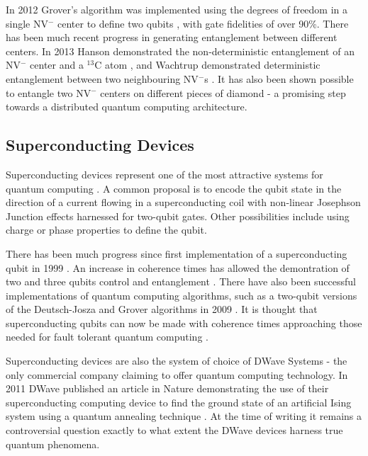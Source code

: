In 2012 Grover's algorithm was implemented using the degrees of freedom in a single NV$^{-}$ center to define two qubits \cite{two_qubit_nv}, with gate fidelities of over 90\%. There has been much recent progress in generating entanglement between different centers. In 2013 Hanson demonstrated the non-deterministic entanglement of an NV$^{-}$ center and a $^{13}$C atom \cite{nv_entanglement_hanson}, and Wachtrup demonstrated deterministic entanglement between two neighbouring NV$^{-}$s \cite{nv_entanglement_wachtrup}. It has also been shown possible to entangle two NV$^{-}$ centers on different pieces of diamond \cite{remote_nv_entanglement_hanson} - a promising step towards a distributed quantum computing architecture.  

\subsection{Superconducting Devices}

Superconducting devices represent one of the most attractive systems for quantum computing  \cite{superconducting_review_11}. A common proposal is to encode the qubit state in the direction of a current flowing in a superconducting coil with non-linear Josephson Junction \cite{josephson_junction} effects harnessed for two-qubit gates. Other possibilities include using charge or phase properties to define the qubit.

There has been much progress since first implementation of a superconducting qubit in 1999 \cite{superconducting_first_qubit}. An increase in coherence times \cite{superconducting_better_coherence_03} has allowed the demontration of two and three qubits control and entanglement \cite{ superconduction_bell_violation_09, superconducting_measurement_10}. There have also been successful implementations of quantum computing algorithms, such as a two-qubit versions of the Deutsch-Josza and Grover algorithms in 2009 \cite{two_qubit_chip_yale}.
It is thought that superconducting qubits can now be made with coherence times approaching those needed for fault tolerant quantum computing \cite{superconducting_long_coherence_11}.

Superconducting devices are also the system of choice of DWave Systems - the only commercial company claiming to offer quantum computing technology. In 2011 DWave published an article in Nature demonstrating the use of their superconducting computing device to find the ground state of an artificial Ising system using a quantum annealing technique \cite{dwave_annealing}. At the time of writing it remains a controversial question exactly to what extent the DWave devices harness true quantum phenomena.

